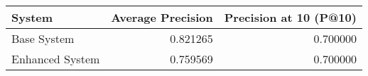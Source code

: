 \begin{tabular}{lrr}
\toprule
System & Average Precision & Precision at 10 (P@10) \\
\midrule
Base System & 0.821265 & 0.700000 \\
Enhanced System & 0.759569 & 0.700000 \\
\bottomrule
\end{tabular}
